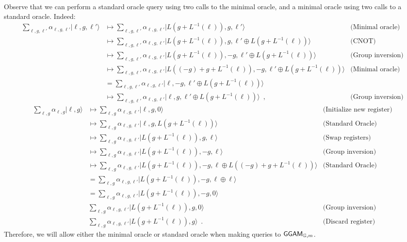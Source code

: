 \documentclass{article}\usepackage[a4paper,margin=20mm]{geometry}
\numberwithin{theorem}{section}
\numberwithin{equation}{section}
\newcommand{\G}{\mathbb{G}}
\newcommand{\GGAM}{{\sf GGAM}}
\begin{document}
Observe that we can perform a standard oracle query using two calls to the minimal oracle, and a minimal oracle using two calls to a standard oracle. Indeed:
\begin{align*}
	\sum_{\ell,g,\ell'}\alpha_{\ell,g,\ell'}|\ell,g,\ell'\rangle&\mapsto \sum_{\ell,g,\ell'}\alpha_{\ell,g,\ell'}|L(g+L^{-1}(\ell)),g,\ell'\rangle&\text{(Minimal oracle)}\\
	&\mapsto \sum_{\ell,g,\ell'}\alpha_{\ell,g,\ell'}|L(g+L^{-1}(\ell)),g,\ell'\oplus L(g+L^{-1}(\ell))\rangle&\text{(CNOT)}\\
	&\mapsto \sum_{\ell,g,\ell'}\alpha_{\ell,g,\ell'}|L(g+L^{-1}(\ell)),-g,\ell'\oplus L(g+L^{-1}(\ell))\rangle&\text{(Group inversion)}\\
	&\mapsto \sum_{\ell,g,\ell'}\alpha_{\ell,g,\ell'}|L((-g)+g+L^{-1}(\ell)),-g,\ell'\oplus L(g+L^{-1}(\ell))\rangle&\text{(Minimal oracle)}\\
	&=\sum_{\ell,g,\ell'}\alpha_{\ell,g,\ell'}|\ell,-g,\ell'\oplus L(g+L^{-1}(\ell))\rangle&\\
	&\mapsto \sum_{\ell,g,\ell'}\alpha_{\ell,g,\ell'}|\ell,g,\ell'\oplus L(g+L^{-1}(\ell))\rangle\enspace ,&\text{(Group inversion)}
\end{align*}
\begin{align*}
	\sum_{\ell,g}\alpha_{\ell,g}|\ell,g\rangle&\mapsto \sum_{\ell,g}\alpha_{\ell,g,\ell'}|\ell,g,0\rangle&\text{(Initialize new register)}\\
	&\mapsto \sum_{\ell,g}\alpha_{\ell,g,\ell'}|\ell,g,L(g+L^{-1}(\ell))\rangle&\text{(Standard Oracle)}\\
	&\mapsto \sum_{\ell,g}\alpha_{\ell,g,\ell'}|L(g+L^{-1}(\ell)),g,\ell\rangle&\text{(Swap registers)}\\
	&\mapsto \sum_{\ell,g}\alpha_{\ell,g,\ell'}|L(g+L^{-1}(\ell)),-g,\ell\rangle&\text{(Group inversion)}\\
	&\mapsto \sum_{\ell,g}\alpha_{\ell,g,\ell'}|L(g+L^{-1}(\ell)),-g,\ell\oplus L((-g)+g+L^{-1}(\ell))\rangle&\text{(Standard Oracle)}\\
	&=\sum_{\ell,g}\alpha_{\ell,g,\ell'}|L(g+L^{-1}(\ell)),-g,\ell\oplus \ell\rangle&\\
	&=\sum_{\ell,g}\alpha_{\ell,g,\ell'}|L(g+L^{-1}(\ell)),-g,0\rangle&\\
	&\sum_{\ell,g}\alpha_{\ell,g,\ell'}|L(g+L^{-1}(\ell)),g,0\rangle&\text{(Group inversion)}\\
	&\sum_{\ell,g}\alpha_{\ell,g,\ell'}|L(g+L^{-1}(\ell)),g\rangle\enspace .&\text{(Discard register)}
\end{align*}
Therefore, we will allow either the minimal oracle or standard oracle when making queries to $\GGAM_{\G,m}$.
\end{document}
